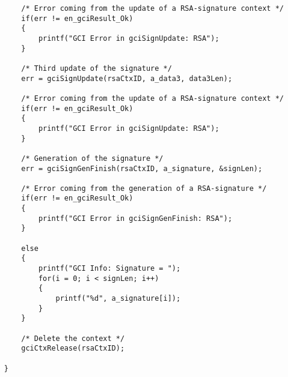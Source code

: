 \begin{lstlisting}
	    /* Error coming from the update of a RSA-signature context */
	    if(err != en_gciResult_Ok)
	    {
	        printf("GCI Error in gciSignUpdate: RSA");
	    }

	    /* Third update of the signature */
	    err = gciSignUpdate(rsaCtxID, a_data3, data3Len);

	    /* Error coming from the update of a RSA-signature context */
	    if(err != en_gciResult_Ok)
	    {
	        printf("GCI Error in gciSignUpdate: RSA");
	    }

	    /* Generation of the signature */
	    err = gciSignGenFinish(rsaCtxID, a_signature, &signLen);

	    /* Error coming from the generation of a RSA-signature */
	    if(err != en_gciResult_Ok)
	    {
	        printf("GCI Error in gciSignGenFinish: RSA");
	    }

	    else
	    {
	        printf("GCI Info: Signature = ");
	        for(i = 0; i < signLen; i++)
	        {
	            printf("%d", a_signature[i]);
	        }
	    }

	    /* Delete the context */
	    gciCtxRelease(rsaCtxID);

	}
\end{lstlisting}
